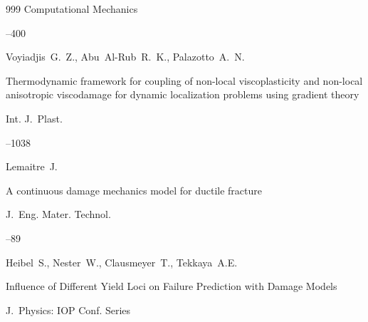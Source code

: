 \begin{thebibliography}{999}
\jour Computational Mechanics  




--400





\by Voyiadjis~G.~Z., Abu~Al-Rub~R.~K., Palazotto~A.~N. 

\paper Thermodynamic framework for coupling of non-local viscoplasticity and non-local anisotropic viscodamage for dynamic localization problems using gradient theory

\jour Int. J.~Plast.




--1038






\by Lemaitre~J. 

\paper A continuous damage mechanics model for ductile fracture

\jour J.~Eng. Mater. Technol.  




--89






\by Heibel~S., Nester~W., Clausmeyer~T., Tekkaya~A.E. 

\paper Influence of Different Yield Loci on Failure Prediction with Damage Models

\jour J.~Physics: IOP Conf. Series









\end{thebibliography}
